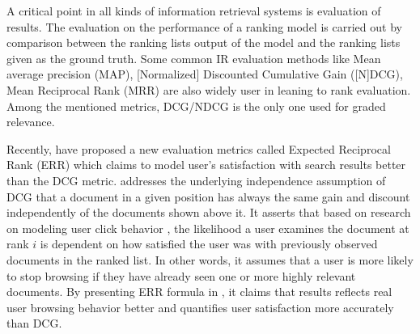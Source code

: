 A critical point in all kinds of information retrieval systems is evaluation of results. The evaluation on the performance of a ranking model is carried out by comparison between the ranking lists output of the model and the ranking lists given as the ground truth. Some common IR evaluation methods like Mean average precision (MAP), [Normalized] Discounted Cumulative Gain ([N]DCG), Mean Reciprocal Rank (MRR) are also widely user in leaning to rank evaluation. Among the mentioned metrics, DCG/NDCG is the only one used for graded relevance.

Recently, \citet{l2r-err} have proposed a new evaluation metrics called Expected Reciprocal Rank (ERR) which claims to model user's satisfaction with search results better than the DCG metric. \citet{l2r-err} addresses the underlying independence assumption of DCG that a document in a given position has always the same gain and discount independently of the documents shown above it. It asserts that based on research on modeling user click behavior \citep{l2r-clickmodel1,l2r-clickmodel2}, the likelihood a user examines the document at rank $i$ is dependent on how satisfied the user was with previously observed documents in the ranked list. In other words, it assumes that a user is more likely to stop browsing if they have already seen one or more highly relevant documents. By presenting ERR formula in \cite{l2r-err}, it claims that results reflects real user browsing behavior better and quantifies user satisfaction more accurately than DCG.
